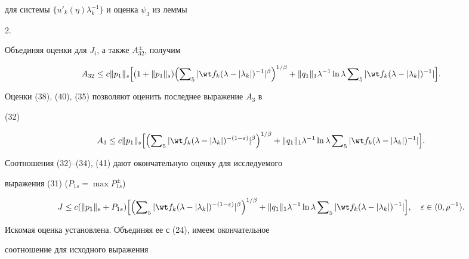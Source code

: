 {для системы $\{u'_k(\eta)\lambda^{-1}_k\}$ и оценка $\psi_3$ из леммы


2.





Объединяя оценки для $J_i$, а также $A^\pm_{32}$, получим


\begin{equation}


A_{32}\le c\|p_1\|_s \Bigl[ (1+\|p_1\|_s)\Bigl( \sumn_5


|\wt f_k(\lambda-|\lambda_k|)^{-1}|^\beta\Bigr)^{1/\beta}+


\|q_1\|_1\lambda^{-1}\ln\lambda\sumn_5


|\wt f_k(\lambda-|\lambda_k|)^{-1}|\Bigr].


\end{equation}


Оценки (38), (40), (35) позволяют оценить последнее выражение $A_3$ в


(32)


\begin{equation}


A_3\le c\|p_1\|_s\Bigl[\Bigl(\sumn_5|\wt f_k(\lambda-


|\lambda_k|)^{-(1-\varepsilon)}|^\beta\Bigr)^{1/\beta}+


\|q_1\|_1\lambda^{-1}\ln\lambda\sumn_5


|\wt f_k(\lambda-|\lambda_k|)^{-1}|\Bigr].


\end{equation}


Соотношения (32)--(34), (41) дают окончательную оценку для исследуемого


выражения (31) ($P_{1s}=\max P^\pm_{1s}$)


\begin{equation}


J\le c(\|p_1\|_s+P_{1s})\Bigl[\Bigl(\sumn_5


|\wt f_k(\lambda-|\lambda_k|)^{-(1-\varepsilon)}|^\beta


\Bigr)^{1/\beta}+\|q_1\|_1\lambda^{-1}\ln\lambda\sumn_5


|\wt f_k(\lambda-|\lambda_k|)^{-1}|\Bigr],\quad


\varepsilon\in(0,\rho^{-1}).


\end{equation}


Искомая оценка установлена. Объединяя ее с (24), имеем окончательное


соотношение для исходного выражения


}
